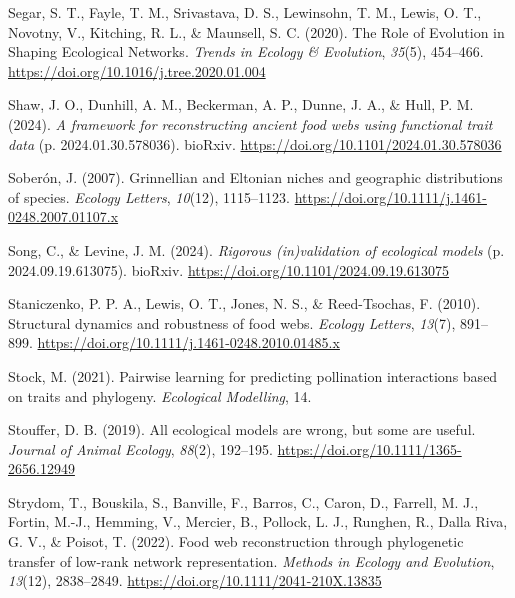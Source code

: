 \documentclass[
]{article}
\newlength{\cslhangindent}
\newenvironment{CSLReferences}[2] %
 {\begin{list}{}{%
  \setlength{\itemindent}{0pt}
  \setlength{\leftmargin}{0pt}
  \setlength{\parsep}{0pt}
  \ifodd #1
   \setlength{\leftmargin}{\cslhangindent}
   \setlength{\itemindent}{-1\cslhangindent}
  \fi
  \setlength{\itemsep}{#2\baselineskip}}}
 {\end{list}}
\begin{document}
\begin{CSLReferences}{1}{0}
Segar, S. T., Fayle, T. M., Srivastava, D. S., Lewinsohn, T. M., Lewis,
O. T., Novotny, V., Kitching, R. L., \& Maunsell, S. C. (2020). The
{Role} of {Evolution} in {Shaping Ecological Networks}. \emph{Trends in
Ecology \& Evolution}, \emph{35}(5), 454--466.
\url{https://doi.org/10.1016/j.tree.2020.01.004}

Shaw, J. O., Dunhill, A. M., Beckerman, A. P., Dunne, J. A., \& Hull, P.
M. (2024). \emph{A framework for reconstructing ancient food webs using
functional trait data} (p. 2024.01.30.578036). bioRxiv.
\url{https://doi.org/10.1101/2024.01.30.578036}

Soberón, J. (2007). Grinnellian and {Eltonian} niches and geographic
distributions of species. \emph{Ecology Letters}, \emph{10}(12),
1115--1123. \url{https://doi.org/10.1111/j.1461-0248.2007.01107.x}

Song, C., \& Levine, J. M. (2024). \emph{Rigorous (in)validation of
ecological models} (p. 2024.09.19.613075). bioRxiv.
\url{https://doi.org/10.1101/2024.09.19.613075}

Staniczenko, P. P. A., Lewis, O. T., Jones, N. S., \& Reed-Tsochas, F.
(2010). Structural dynamics and robustness of food webs. \emph{Ecology
Letters}, \emph{13}(7), 891--899.
\url{https://doi.org/10.1111/j.1461-0248.2010.01485.x}

Stock, M. (2021). Pairwise learning for predicting pollination
interactions based on traits and phylogeny. \emph{Ecological Modelling},
14.

Stouffer, D. B. (2019). All ecological models are wrong, but some are
useful. \emph{Journal of Animal Ecology}, \emph{88}(2), 192--195.
\url{https://doi.org/10.1111/1365-2656.12949}

Strydom, T., Bouskila, S., Banville, F., Barros, C., Caron, D., Farrell,
M. J., Fortin, M.-J., Hemming, V., Mercier, B., Pollock, L. J., Runghen,
R., Dalla Riva, G. V., \& Poisot, T. (2022). Food web reconstruction
through phylogenetic transfer of low-rank network representation.
\emph{Methods in Ecology and Evolution}, \emph{13}(12), 2838--2849.
\url{https://doi.org/10.1111/2041-210X.13835}


\end{CSLReferences}
\end{document}
